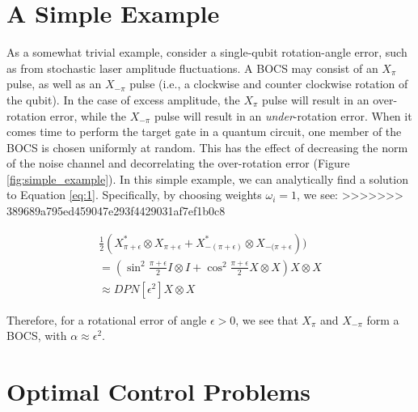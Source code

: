 \documentclass[aps,nofootinbib,pra,notitlepage,twocolumn]{revtex4-1}
\begin{document}
\section{A Simple Example}
As a somewhat trivial example, consider a single-qubit rotation-angle error, such as from stochastic laser amplitude fluctuations. A BOCS may consist of an $X_\pi$ pulse, as well as an $X_{-\pi}$ pulse (i.e., a clockwise and counter clockwise rotation of the qubit). In the case of excess amplitude, the $X_\pi$ pulse will result in an over-rotation error, while the $X_{-\pi}$ pulse will result in an \emph{under}-rotation error. When it comes time to perform the target gate in a quantum circuit, one member of the BOCS is chosen uniformly at random. This has the effect of decreasing the norm of the noise channel and decorrelating the over-rotation error (Figure \ref{fig:simple_example}). In this simple example, we can analytically find a solution to Equation \ref{eq:1}. Specifically, by choosing weights $\omega_i=1$, we see:
>>>>>>> 389689a795ed459047e293f4429031af7ef1b0c8

\begin{equation}
  \begin{gathered}
    \frac{1}{2}(X^*_{\pi + \epsilon}\otimes X_{\pi + \epsilon} + X^*_{-(\pi + \epsilon)}\otimes X_{-(\pi + \epsilon})) \\
    = (\sin^2{\frac{\pi + \epsilon}{2}}I\otimes I + \cos^2{\frac{\pi + \epsilon}{2}}X\otimes X)X\otimes X \\
    \approx DPN[\epsilon^2]X\otimes X
  \end{gathered}
\end{equation}

Therefore, for a rotational error of angle $\epsilon > 0$, we see that $X_\pi$ and  $X_{-\pi}$  form a BOCS, with $\alpha\approx\epsilon^2$.



\section{Optimal Control Problems}\label{ocp}
\end{document}

